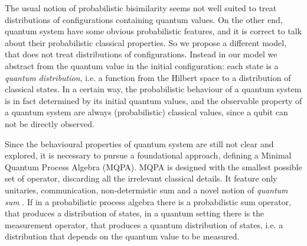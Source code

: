 The usual notion of probabilistic bisimilarity seems not well suited to treat distributions of configurations containing quantum values. On the other end, quantum system have some obvious probabilistic features, and it is correct to talk about their probabilistic classical properties. So we propose a different model, that does not treat distributions of configurations. Instead in our model we abstract from the quantum value in the initial configuration: each state is a \textit{quantum distribution}, i.e. a function from the Hilbert space to a distribution of classical states. In a certain way, the probabilistic behaviour of a quantum system is in fact determined by its initial quantum values, and the observable property of a quantum system are always (probabilistic) classical values, since a qubit can not be directly observed.

Since the behavioural properties of quantum system are still not clear and explored, it is necessary to pursue a foundational approach, defining a Minimal Quantum Process Algebra (MQPA). MQPA is designed  with the smallest possible set of operator, discarding all the irrelevant classical details. It feature only unitaries, communication, non-determistic sum and a novel notion of \textit{quantum sum} . If in a probabilistic process algebra there is a probabilistic sum operator, that produces a distribution of states, in a quantum setting there is the measurement operator, that produces a quantum distribution of states, i.e. a distribution that depends on the quantum value to be measured.
 